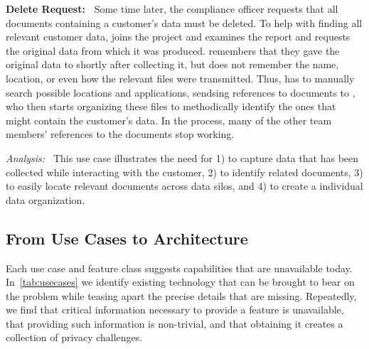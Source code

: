 \noindent\textbf{Delete Request:~}
Some time later, the compliance officer requests that all documents containing a customer's data must be deleted. 
To help with finding all relevant customer data, \persb joins the project and examines the report and requests the original data from which it was produced. 
\persa remembers that they gave the original data to \persc shortly after collecting it, but does not remember the name, location, or even how the relevant files were transmitted. Thus, \persa has to manually search possible locations and applications, sendsing references to documents to \persb, who then starts organizing these files to methodically identify the ones that might contain the customer's data. In the process, many of the other team members' references to the documents stop working.

\noindent\textit{Analysis:~}
This use case illustrates the need for 1) \usecaseactivitycontext to capture data that has been collected while 
interacting with the customer, 2) \usecasedatarelationship to identify related documents, 3) \usecasecrosssilosearch to easily locate relevant documents across data silos, and 4) \usecasepersnamespace to 
create a individual data organization.



\subsection{From Use Cases to Architecture}
Each use case and feature class suggests capabilities that are unavailable today.
In~\autoref{tab:usecases} we identify existing technology that can be brought to bear on the problem while teasing apart the precise details that are missing.
Repeatedly, we find that critical information necessary to provide a feature is unavailable, that providing such information is non-trivial, and that obtaining it creates a collection of privacy challenges.